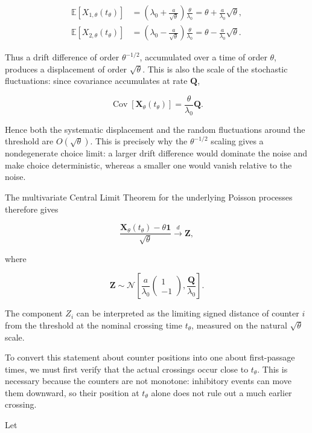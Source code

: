 \documentclass[
  man,
  floatsintext,
  longtable,
  a4paper,
  nolmodern,
  notxfonts,
  notimes,
  colorlinks=true,linkcolor=blue,citecolor=blue,urlcolor=blue]{apa7}
\begin{document}
\[
\begin{aligned}
\mathbb{E}[X_{1,\theta}(t_\theta)]
&=
\left(
\lambda_0+\frac{a}{\sqrt{\theta}}
\right)
\frac{\theta}{\lambda_0}
=
\theta+\frac{a}{\lambda_0}\sqrt{\theta},\\
\mathbb{E}[X_{2,\theta}(t_\theta)]
&=
\left(
\lambda_0-\frac{a}{\sqrt{\theta}}
\right)
\frac{\theta}{\lambda_0}
=
\theta-\frac{a}{\lambda_0}\sqrt{\theta}.
\end{aligned}
\]

Thus a drift difference of order \(\theta^{-1/2}\), accumulated over a
time of order \(\theta\), produces a displacement of order
\(\sqrt{\theta}\). This is also the scale of the stochastic
fluctuations: since covariance accumulates at rate \(\mathbf Q\),

\[
\operatorname{Cov}\!\left[\mathbf X_\theta(t_\theta)\right]
=
\frac{\theta}{\lambda_0}\mathbf Q.
\]

Hence both the systematic displacement and the random fluctuations
around the threshold are \(O(\sqrt{\theta})\). This is precisely why the
\(\theta^{-1/2}\) scaling gives a nondegenerate choice limit: a larger
drift difference would dominate the noise and make choice deterministic,
whereas a smaller one would vanish relative to the noise.

The multivariate Central Limit Theorem for the underlying Poisson
processes therefore gives

\[
\frac{
\mathbf X_\theta(t_\theta)-\theta\mathbf 1
}{
\sqrt{\theta}
}
\xrightarrow{d}
\mathbf Z,
\]

where

\[
\mathbf Z
\sim
\mathcal N
\left[
\frac{a}{\lambda_0}
\begin{pmatrix}
1\\
-1
\end{pmatrix},
\frac{\mathbf Q}{\lambda_0}
\right].
\]

The component \(Z_i\) can be interpreted as the limiting signed distance
of counter \(i\) from the threshold at the nominal crossing time
\(t_\theta\), measured on the natural \(\sqrt{\theta}\) scale.

To convert this statement about counter positions into one about
first-passage times, we must first verify that the actual crossings
occur close to \(t_\theta\). This is necessary because the counters are
not monotone: inhibitory events can move them downward, so their
position at \(t_\theta\) alone does not rule out a much earlier
crossing.

Let
\end{document}
